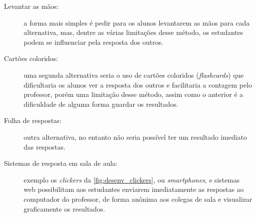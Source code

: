 \begin{description}
  \item[Levantar as mãos:] a forma mais simples é pedir para os alunos levantarem as mãos para cada alternativa,
  mas, dentre as várias limitações desse método, os estudantes podem se influenciar pela resposta dos outros.
  \item[Cartões coloridos:] uma segunda alternativa seria o uso de
  cartões coloridos (\textit{flashcards}) que dificultaria os alunos ver a resposta
  dos outros e facilitaria a contagem pelo professor, porém uma limitação desse método,
  assim como o anterior é a dificuldade de alguma forma guardar os resultados.
  \item[Folha de respostas:] outra alternativa, no entanto não seria possível ter
  um resultado imediato das respostas.
  \item[Sistemas de resposta em sala de aula:] exemplo os \textit{clickers} da \autoref{fig:desenv_clickers}, ou \textit{smartphones},
  e sistemas web possibilitam aos estudantes enviarem imediatamente as respostas ao
  computador do professor, de forma anônima aos colegas de sala e visualizar graficamente
  os resultados.
\end{description}


